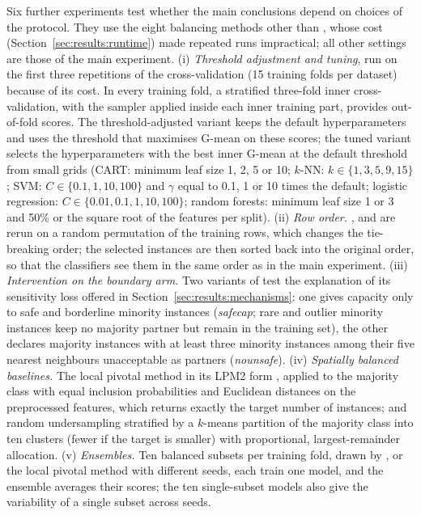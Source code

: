 Six further experiments test whether the main conclusions depend on choices of the protocol. They use the eight balancing methods other than \MUSCO, whose cost (Section~\ref{sec:results:runtime}) made repeated runs impractical; all other settings are those of the main experiment.
(i) \emph{Threshold adjustment and tuning}, run on the first three repetitions of the cross-validation (15 training folds per dataset) because of its cost. In every training fold, a stratified three-fold inner cross-validation, with the sampler applied inside each inner training part, provides out-of-fold scores. The threshold-adjusted variant keeps the default hyperparameters and uses the threshold that maximises G-mean on these scores; the tuned variant selects the hyperparameters with the best inner G-mean at the default threshold from small grids (CART: minimum leaf size 1, 2, 5 or 10; $k$-NN: $k\in\{1,3,5,9,15\}$; SVM: $C\in\{0.1,1,10,100\}$ and $\gamma$ equal to 0.1, 1 or 10 times the default; logistic regression: $C\in\{0.01,0.1,1,10,100\}$; random forests: minimum leaf size 1 or 3 and 50\% or the square root of the features per split).
(ii) \emph{Row order.} \MUSBS, \MUSBO{} and \MUSCS{} are rerun on a random permutation of the training rows, which changes the tie-breaking order; the selected instances are then sorted back into the original order, so that the classifiers see them in the same order as in the main experiment.
(iii) \emph{Intervention on the boundary arm.} Two variants of \MUSBS{} test the explanation of its sensitivity loss offered in Section~\ref{sec:results:mechanisms}: one gives capacity only to safe and borderline minority instances (\emph{safecap}; rare and outlier minority instances keep no majority partner but remain in the training set), the other declares majority instances with at least three minority instances among their five nearest neighbours unacceptable as partners (\emph{nounsafe}).
(iv) \emph{Spatially balanced baselines.} The local pivotal method in its LPM2 form \citep{grafstrom2012spatially}, applied to the majority class with equal inclusion probabilities and Euclidean distances on the preprocessed features, which returns exactly the target number of instances; and random undersampling stratified by a $k$-means partition of the majority class into ten clusters (fewer if the target is smaller) with proportional, largest-remainder allocation.
(v) \emph{Ensembles.} Ten balanced subsets per training fold, drawn by \RUS, \MUSCS{} or the local pivotal method with different seeds, each train one model, and the ensemble averages their scores; the ten single-subset models also give the variability of a single subset across seeds.
